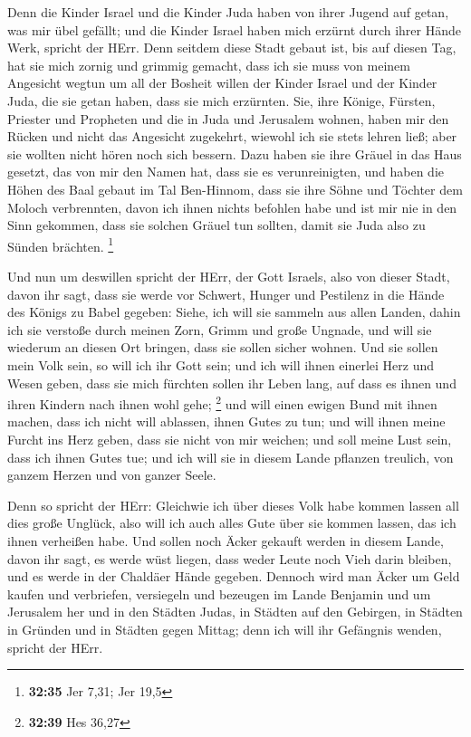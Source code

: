  Denn die Kinder Israel und die Kinder Juda haben von
ihrer Jugend auf getan, was mir übel gefällt; und die Kinder Israel
haben mich erzürnt durch ihrer Hände Werk, spricht der HErr.
 Denn seitdem diese Stadt gebaut ist, bis auf diesen Tag,
hat sie mich zornig und grimmig gemacht, dass ich sie muss von meinem
Angesicht wegtun  um all der Bosheit willen der Kinder
Israel und der Kinder Juda, die sie getan haben, dass sie mich
erzürnten. Sie, ihre Könige, Fürsten, Priester und Propheten und die in
Juda und Jerusalem wohnen,  haben mir den Rücken und
nicht das Angesicht zugekehrt, wiewohl ich sie stets lehren ließ; aber
sie wollten nicht hören noch sich bessern.  Dazu haben
sie ihre Gräuel in das Haus gesetzt, das von mir den Namen hat, dass sie
es verunreinigten,  und haben die Höhen des Baal gebaut
im Tal Ben-Hinnom, dass sie ihre Söhne und Töchter dem Moloch
verbrennten, davon ich ihnen nichts befohlen habe und ist mir nie in den
Sinn gekommen, dass sie solchen Gräuel tun sollten, damit sie Juda also
zu Sünden brächten. \footnote{\textbf{32:35} Jer 7,31; Jer 19,5}

 Und nun um deswillen spricht der HErr, der Gott Israels,
also von dieser Stadt, davon ihr sagt, dass sie werde vor Schwert,
Hunger und Pestilenz in die Hände des Königs zu Babel gegeben:
 Siehe, ich will sie sammeln aus allen Landen, dahin ich
sie verstoße durch meinen Zorn, Grimm und große Ungnade, und will sie
wiederum an diesen Ort bringen, dass sie sollen sicher wohnen.
 Und sie sollen mein Volk sein, so will ich ihr Gott
sein;  und ich will ihnen einerlei Herz und Wesen geben,
dass sie mich fürchten sollen ihr Leben lang, auf dass es ihnen und
ihren Kindern nach ihnen wohl gehe; \footnote{\textbf{32:39} Hes 36,27}
 und will einen ewigen Bund mit ihnen machen, dass ich
nicht will ablassen, ihnen Gutes zu tun; und will ihnen meine Furcht ins
Herz geben, dass sie nicht von mir weichen;  und soll
meine Lust sein, dass ich ihnen Gutes tue; und ich will sie in diesem
Lande pflanzen treulich, von ganzem Herzen und von ganzer Seele.

 Denn so spricht der HErr: Gleichwie ich über dieses Volk
habe kommen lassen all dies große Unglück, also will ich auch alles Gute
über sie kommen lassen, das ich ihnen verheißen habe. 
Und sollen noch Äcker gekauft werden in diesem Lande, davon ihr sagt, es
werde wüst liegen, dass weder Leute noch Vieh darin bleiben, und es
werde in der Chaldäer Hände gegeben.  Dennoch wird man
Äcker um Geld kaufen und verbriefen, versiegeln und bezeugen im Lande
Benjamin und um Jerusalem her und in den Städten Judas, in Städten auf
den Gebirgen, in Städten in Gründen und in Städten gegen Mittag; denn
ich will ihr Gefängnis wenden, spricht der HErr.

